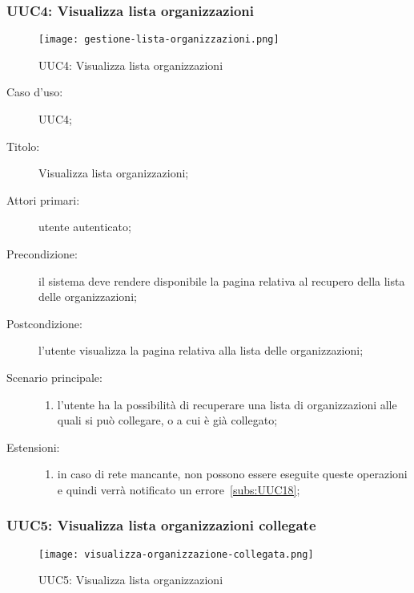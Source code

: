 \documentclass[../../../analisi-dei-requisiti.tex]{subfiles}
\begin{document}
\subsubsection{UUC4: Visualizza lista organizzazioni}%
\label{subs:UUC4}


\begin{figure}[H]
  \centering
  \texttt{[image: gestione-lista-organizzazioni.png]}
  \caption{UUC4: Visualizza lista organizzazioni}%
  \label{fig:UUC4}
\end{figure}

\begin{description}
  \item[Caso d'uso:] UUC4;
  \item[Titolo:] Visualizza lista organizzazioni;
  \item[Attori primari:] utente autenticato;
  \item[Precondizione:] il sistema deve rendere disponibile la pagina relativa al recupero della lista delle organizzazioni;
  \item[Postcondizione:] l'utente visualizza la pagina relativa alla lista delle organizzazioni;
  \item[Scenario principale:]
        \begin{enumerate}
          \item l'utente ha la possibilità di recuperare una lista di organizzazioni alle quali si può collegare, o a cui è già collegato;
        \end{enumerate}
  \item[Estensioni:]
        \begin{enumerate}
          \item in caso di rete mancante, non possono essere eseguite queste operazioni e quindi verrà notificato un errore~\ref{subs:UUC18};
        \end{enumerate}
\end{description}



\subsubsection{UUC5: Visualizza lista organizzazioni collegate}%
\label{subs:UUC5}

\begin{figure}[H]
  \centering
  \texttt{[image:  visualizza-organizzazione-collegata.png]}
  \caption{UUC5: Visualizza lista organizzazioni}%
  \label{fig:UUC5}
\end{figure}
\end{document}
